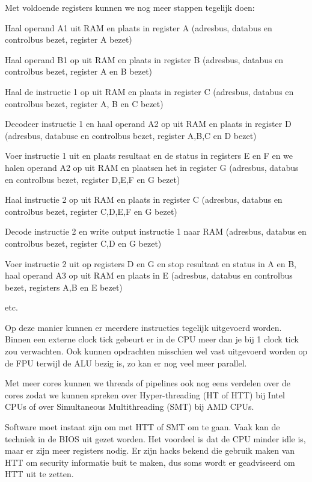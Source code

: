 Met voldoende registers kunnen we nog meer stappen tegelijk doen:
\begin{description}
\item [Clock tick 1 opgaande vlank] Haal operand A1 uit RAM en plaats in register A (adresbus, databus en controlbus bezet, register A bezet)
\item [Clock tick 1 neergaande vlank] Haal operand B1 op uit RAM en plaats in register B (adresbus, databus en controlbus bezet, register A en B bezet)
\item [Clock tick 2 opgaande vlank] Haal de instructie 1 op uit RAM en plaats in register C (adresbus, databus en controlbus bezet, register A, B en C bezet)
\item [Clock tick 2 neergaande vlank] Decodeer instructie 1 en haal operand A2 op uit RAM en plaats in register D (adresbus, databuse en controlbus bezet, register A,B,C en D bezet)
\item [clock tick 3 opgaande vlank] Voer instructie 1 uit en plaats resultaat en de status in registers E en F en we halen operand A2 op uit RAM en plaatsen het in register G (adresbus, databus en controlbus bezet, register D,E,F en G bezet)
\item [clock tick 3 neergaande vlank] Haal instructie 2 op uit RAM en plaats in register C (adresbus, databus en controlbus bezet, register C,D,E,F en G bezet)
\item [clock tick 4 opgaande vlank] Decode instructie 2 en write output instructie 1 naar RAM (adresbus, databus en controlbus bezet, register C,D en G bezet)
\item [Clock tick 4 neergaande vlank] Voer instructie 2 uit op registers D en G en stop resultaat en status in A en B, haal operand A3 op uit RAM en plaats in E (adresbus, databus en controlbus bezet, registers A,B en E bezet)
\item etc.
\end{description}
Op deze manier kunnen er meerdere instructies tegelijk uitgevoerd worden. Binnen een externe clock tick gebeurt er in de CPU meer dan je bij 1 clock tick zou verwachten. Ook kunnen opdrachten misschien wel vast uitgevoerd worden op de FPU terwijl de ALU bezig is, zo kan er nog veel meer parallel.

Met meer cores kunnen we threads of pipelines ook nog eens verdelen over de cores zodat we kunnen spreken over Hyper-threading (HT of HTT) bij Intel CPUs of over Simultaneous Multithreading (SMT) bij AMD CPUs.

Software moet instaat zijn om met HTT of SMT om te gaan. Vaak kan de techniek in de BIOS uit gezet worden. Het voordeel is dat de CPU minder idle is, maar er zijn meer registers nodig. Er zijn hacks bekend die gebruik maken van HTT om security informatie buit te maken, dus soms wordt er geadviseerd om HTT uit te zetten.

